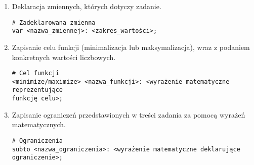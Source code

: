 \begin{enumerate}
\item Deklaracja zmiennych, których dotyczy zadanie.




\begin{lstlisting}[language=zimpl]
# Zadeklarowana zmienna
var <nazwa_zmiennej>: <zakres_wartości>;
\end{lstlisting}

\item Zapisanie celu funkcji (minimalizacja lub maksymalizacja), wraz z podaniem konkretnych wartości liczbowych.

\begin{lstlisting}[language=zimpl]
# Cel funkcji
<minimize/maximize> <nazwa_funkcji>: <wyrażenie matematyczne reprezentujące
funkcję celu>;
\end{lstlisting}

\item Zapisanie ograniczeń przedstawionych w treści zadania za pomocą wyrażeń matematycznych.

\begin{lstlisting}[language=zimpl]
# Ograniczenia
subto <nazwa_ograniczenia>: <wyrażenie matematyczne deklarujące ograniczenie>;
\end{lstlisting}
\end{enumerate}

